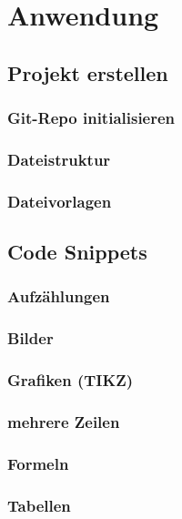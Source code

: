 \section{Anwendung}
\subsection{Projekt erstellen}
\subsubsection{Git-Repo initialisieren}
\subsubsection{Dateistruktur}
\subsubsection{Dateivorlagen}

\subsection{Code Snippets}
\subsubsection{Aufzählungen}
\subsubsection{Bilder}
\subsubsection{Grafiken (TIKZ)}
\subsubsection{mehrere Zeilen}
\subsubsection{Formeln}
\subsubsection{Tabellen}